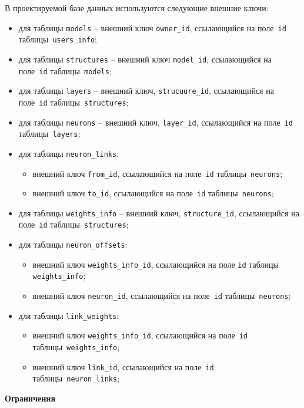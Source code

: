 В проектируемой базе данных используются следующие внешние ключи:
\begin{itemize}
	\item для таблицы \texttt{models} -- внешний ключ \texttt{owner\_id}, ссылающийся на поле~\texttt{id} таблицы~\texttt{users\_info};
	\item для таблицы \texttt{structures} -- внешний ключ \texttt{model\_id}, ссылающийся на поле~\texttt{id} таблицы~\texttt{models};
		\item для таблицы \texttt{layers} -- внешний ключ, \texttt{strucuure\_id}, ссылающийся на поле~\texttt{id} таблицы~\texttt{structures};
		\item для таблицы \texttt{neurons} -- внешний ключ, \texttt{layer\_id}, ссылающийся на поле~\texttt{id} таблицы~\texttt{layers};
		\item для таблицы \texttt{neuron\_links}:
			\begin{itemize}
				\item внешний ключ \texttt{from\_id}, ссылающийся на поле~\texttt{id} таблицы~\texttt{neurons};
				\item  внешний ключ \texttt{to\_id}, ссылающийся на поле~\texttt{id} таблицы~\texttt{neurons};
			\end{itemize}
		\item для таблицы \texttt{weights\_info} -- внешний ключ, \texttt{structure\_id}, ссылающийся на поле~\texttt{id} таблицы~\texttt{structures};
		\item для таблицы \texttt{neuron\_offsets}:
			\begin{itemize}
				\item внешний ключ \texttt{weights\_info\_id}, ссылающийся на поле \texttt{id} таблицы \texttt{weights\_info};
				\item внешний ключ \texttt{neuron\_id}, ссылающийся на поле~\texttt{id} таблицы~\texttt{neurons};
			\end{itemize}
		\item для таблицы \texttt{link\_weights}:
			\begin{itemize}
				\item внешний ключ \texttt{weights\_info\_id}, ссылающийся на поле~\texttt{id} таблицы~\texttt{weights\_info};
				\item внешний ключ \texttt{link\_id}, ссылающийся на поле~\texttt{id} таблицы~\texttt{neuron\_links};
			\end{itemize}
\end{itemize}

\noindent\textbf{Ограничения}\\

